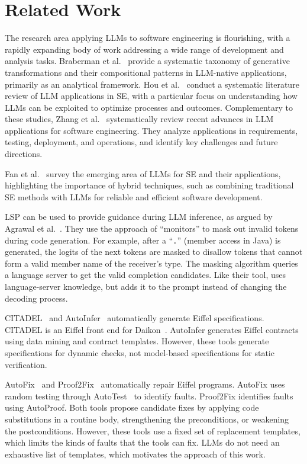\documentclass[runningheads]{llncs}
\begin{document}
\section{Related Work}\label{related-work}

The research area applying LLMs to software engineering is flourishing, with a rapidly expanding body of work addressing a wide range of development and analysis tasks. Braberman et al.~\cite{braberman2025generativetransformationspatternsllmnative} provide a systematic taxonomy of generative transformations and their compositional patterns in LLM-native applications, primarily as an analytical framework. Hou et al.~\cite{hou2024large} conduct a systematic literature review of LLM applications in SE, with a particular focus on understanding how LLMs can be exploited to optimize processes and outcomes. Complementary to these studies, Zhang et al.~\cite{zhang2024unifyingperspectivesnlpsoftware} systematically review recent advances in LLM applications for software engineering. They analyze applications in requirements, testing, deployment, and operations, and identify key challenges and future directions.

Fan et al.~\cite{fan2023largelanguagemodelssoftware} survey the emerging area of LLMs for SE and their applications, highlighting the importance of hybrid techniques, such as combining traditional SE methods with LLMs for reliable and efficient software development. 

LSP can be used to provide guidance during LLM inference, as argued by Agrawal et al.~\cite{monitors}.
They use the approach of ``monitors'' to mask out invalid tokens during code generation.
For example, after a ``\texttt{.}'' (member access in Java) is generated,
the logits of the next tokens are masked to
disallow tokens that cannot form a valid member name of the receiver's type.
The masking algorithm
queries a language server to get the valid completion candidates. Like their tool,
\toolname{} uses language-server knowledge, but adds it to the prompt instead
of changing the decoding process.

CITADEL~\cite{citadel} and AutoInfer~\cite{autoinfer} automatically generate Eiffel specifications. CITADEL is an Eiffel front end for Daikon~\cite{daikon}. AutoInfer generates Eiffel contracts using data mining and contract templates.
However, these tools generate specifications for dynamic checks, not model-based specifications for static verification.

AutoFix~\cite{autofix} and Proof2Fix~\cite{proof2fix} automatically repair Eiffel programs. AutoFix uses random testing through AutoTest~\cite{autotest} to identify faults. Proof2Fix identifies faults using AutoProof.
Both tools propose candidate fixes by applying code substitutions in a routine body,
strengthening the preconditions, or weakening the postconditions.
However, these tools use a fixed set of replacement templates,
which limits the kinds of faults that the tools can fix. LLMs do not need an exhaustive
list of templates, which motivates the approach of this work.
\end{document}
